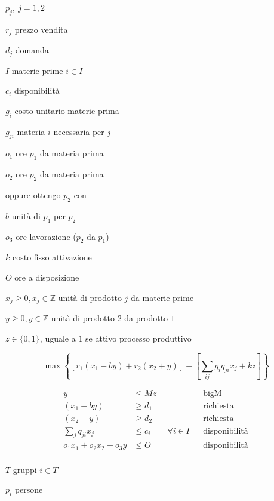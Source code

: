 \Es

\Par

$p_{j} ,\ j=1,2$

$r_{j}$ prezzo vendita

$d_{j}$ domanda

$I$ materie prime $i\in I$

$c_{i}$ disponibilità

$g_{i}$ costo unitario materie prima

$g_{ji}$ materia $i$ necessaria per $j$

$o_{1}$ ore $p_{1}$ da materia prima

$o_{2}$ ore $p_{2}$ da materia prima

oppure ottengo $p_{2}$ con

$b$ unità di $p_{1}$ per $p_{2}$

$o_{3}$ ore lavorazione ($p_{2}$ da $p_{1}$)

$k$ costo fisso attivazione

$O$ ore a disposizione

\Var

$x_{j} \geq 0,x_{j} \in \mathbb{Z}$ unità di prodotto $j$ da materie prime

$y\geq 0,y\in \mathbb{Z}$ unità di prodotto $2$ da prodotto $1$

$z\in \{0,1\}$, uguale a $1$ se attivo processo produttivo

\Fob

\begin{equation*}
	\max\left\{[ r_{1}( x_{1} -by) +r_{2}( x_{2} +y)] -\left[\sum _{ij} g_{i} q_{ji} x_{j} +kz\right]\right\}
\end{equation*}

\Vin

\begin{align*}
	y&\leq Mz && \text{bigM}\\
	( x_{1} -by) &\geq d_{1} && \text{richiesta}\\
	( x_{2} -y) &\geq d_{2} && \text{richiesta}\\
	\sum _{j} q_{ji} x_{j} &\leq c_{i} \qquad\forall i\in I && \text{disponibilità}\\
	o_{1} x_{1} +o_{2} x_{2} +o_{3} y&\leq O && \text{disponibilità}\\
\end{align*}

\Es

\Par

$T$ gruppi $i\in T$

$p_{i}$ persone

